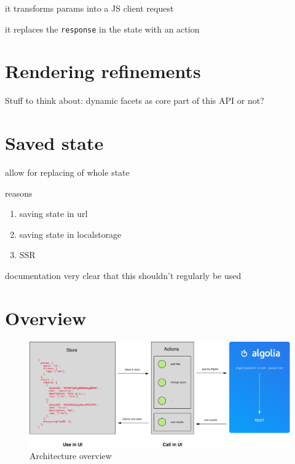 it transforms params into a JS client request

it replaces the {\tt response} in the state with an action


\section{Rendering refinements} %
\label{sec:rendering_refinements}

Stuff to think about: dynamic facets as core part of this API or not?


\section{Saved state} %
\label{sec:saved_state}

allow for replacing of whole state

reasons

\begin{enumerate}
  \item saving state in url
  \item saving state in localstorage
  \item SSR
\end{enumerate}

documentation very clear that this shouldn't regularly be used


\section{Overview} %
\label{sec:overview}

\begin{figure}[H]
\label{figure:core-architecture}
  \centering
  \includegraphics[width=\textwidth]{../assets/architecture.pdf}
  \caption{Architecture overview\cite{blog-architecture}}
\end{figure}

